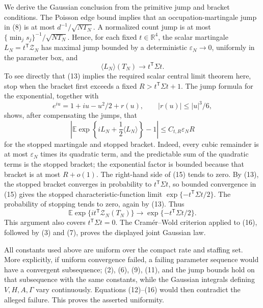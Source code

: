 We derive the Gaussian conclusion from the primitive jump and bracket conditions.  The Poisson edge bound implies that an occupation-martingale jump in (8) is at most \(d^{-1}/\sqrt{NT_N}\).  A normalized count jump is at most
\(\{\min_j s_j\}^{-1}/\sqrt{NT_N}\).  Hence, for each fixed \(t\in\mathbb R^4\), the scalar martingale \(L_N=t^{\mathsf T}\mathcal Z_N\) has maximal jump bounded by a deterministic \(\varepsilon_N\to0\), uniformly in the parameter box, and
\[
 \langle L_N\rangle(T_N)\longrightarrow t^{\mathsf T}\Sigma t. \tag{13}
\]
To see directly that (13) implies the required scalar central limit theorem here, stop when the bracket first exceeds a fixed \(R>t^{\mathsf T}\Sigma t+1\).  The jump formula for the exponential, together with
\[
 e^{iu}=1+iu-u^2/2+r(u),\qquad |r(u)|\leq |u|^3/6,               \tag{14}
\]
shows, after compensating the jumps, that
\[
 \left|\mathbb E\exp\left\{iL_N+\frac12\langle L_N\rangle\right\}-1\right|
 \leq C_{t,R}\varepsilon_N R                                  \tag{15}
\]
for the stopped martingale and stopped bracket.  Indeed, every cubic remainder is at most \(\varepsilon_N\) times its quadratic term, and the predictable sum of the quadratic terms is the stopped bracket; the exponential factor is bounded because that bracket is at most \(R+o(1)\).  The right-hand side of (15) tends to zero.  By (13), the stopped bracket converges in probability to \(t^{\mathsf T}\Sigma t\), so bounded convergence in (15) gives the stopped characteristic-function limit \(\exp\{-t^{\mathsf T}\Sigma t/2\}\).  The probability of stopping tends to zero, again by (13).  Thus
\[
 \mathbb E\exp\{it^{\mathsf T}\mathcal Z_N(T_N)\}
 \longrightarrow \exp\{-t^{\mathsf T}\Sigma t/2\}.             \tag{16}
\]
This argument also covers \(t^{\mathsf T}\Sigma t=0\).  The Cram\'er--Wold criterion applied to (16), followed by (3) and (7), proves the displayed joint Gaussian law.

All constants used above are uniform over the compact rate and staffing set.  More explicitly, if uniform convergence failed, a failing parameter sequence would have a convergent subsequence; (2), (6), (9), (11), and the jump bounds hold on that subsequence with the same constants, while the Gaussian integrals defining \(V,H,A,\Gamma\) vary continuously.  Equations (12)--(16) would then contradict the alleged failure.  This proves the asserted uniformity.

